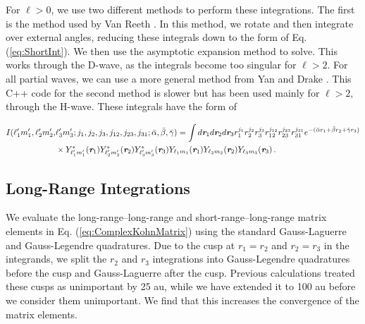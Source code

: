 \documentclass[preprint,showpacs,preprintnumbers,amsmath,amssymb,longbibliography,pra,aps]{revtex4-1}
\begin{document}
For $\ell > 0$, we use two different methods to perform these integrations. The first is the method used by Van Reeth \cite{VanReethThesis}. In this method, we rotate and then integrate over external angles, reducing these integrals down to the form of Eq. (\ref{eq:ShortInt}). We then use the asymptotic expansion method \cite{Drake1995} to solve. This works through the D-wave, as the integrals become too singular for $\ell > 2$. For all partial waves, we can use a more general method from Yan and Drake \cite{Yan1997}. This C++ code for the second method is slower but has been used mainly for $\ell > 2$, through the H-wave. These integrals have the form of
\begin{widetext}
\begin{align}
\label{eq:ShortIntGen}
\nonumber I(\ell_1^\prime m_1^\prime, \ell_2^\prime m_2^\prime, &\ell_3^\prime m_3^\prime; j_1,j_2,j_3,j_{12},j_{23},j_{31}; \bar{\alpha}, \bar{\beta}, \bar{\gamma}) = \int d \textit{\textbf{r}}_1 d \textit{\textbf{r}}_2 d \textit{\textbf{r}}_3
r_1^{j_1} r_2^{j_2} r_3^{j_3} r_{12}^{j_{12}}
r_{23}^{j_{23}} r_{31}^{j_{31}}
e^{-(\bar{\alpha} r_1 + \bar{\beta} r_2 + \bar{\gamma} r_3)} \\
& \times Y_{\ell_1^\prime m_1^\prime}^* (\textit{\textbf{r}}_1) Y_{\ell_2^\prime m_2^\prime}^* (\textit{\textbf{r}}_2) Y_{\ell_3^\prime m_3^\prime}^* (\textit{\textbf{r}}_3) Y_{\ell_1 m_1} (\textit{\textbf{r}}_1) Y_{\ell_2 m_2} (\textit{\textbf{r}}_2) Y_{\ell_3 m_3} (\textit{\textbf{r}}_3)\, .
\end{align}
\end{widetext}

\subsection{Long-Range Integrations}
\label{sec:LongInt}
We evaluate the long-range--long-range and short-range--long-range matrix elements in Eq. (\ref{eq:ComplexKohnMatrix}) using the standard Gauss-Laguerre and Gauss-Legendre quadratures. Due to the cusp at $r_1 = r_2$ and $r_2 = r_3$ in the integrands, we split the $r_2$ and $r_3$ integrations into Gauss-Legendre quadratures before the cusp and Gauss-Laguerre after the cusp. Previous calculations \cite{VanReeth2003,VanReeth2004} treated these cusps as unimportant by 25 au, while we have extended it to 100 au before we consider them unimportant. We find that this increases the convergence of the matrix elements.
\end{document}
